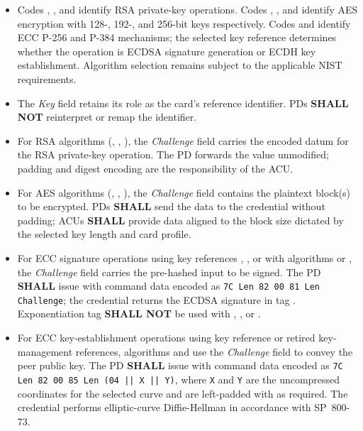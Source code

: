 \begin{itemize}
  \item Codes , , and  identify RSA private-key operations. Codes , , and  identify AES encryption with 128-, 192-, and 256-bit keys respectively. Codes  and  identify ECC P-256 and P-384 mechanisms; the selected key reference determines whether the operation is ECDSA signature generation or ECDH key establishment. Algorithm selection remains subject to the applicable NIST requirements.
  \item The \emph{Key} field retains its role as the card’s reference identifier. PDs \textbf{SHALL NOT} reinterpret or remap the identifier.
  \item For RSA algorithms (, , ), the \emph{Challenge} field carries the encoded datum for the RSA private-key operation. The PD forwards the value unmodified; padding and digest encoding are the responsibility of the ACU.
  \item For AES algorithms (, , ), the \emph{Challenge} field contains the plaintext block(s) to be encrypted. PDs \textbf{SHALL} send the data to the credential without padding; ACUs \textbf{SHALL} provide data aligned to the block size dictated by the selected key length and card profile.
  \item For ECC signature operations using key references , , or  with algorithms  or , the \emph{Challenge} field carries the pre-hashed input to be signed. The PD \textbf{SHALL} issue  with command data encoded as \texttt{7C Len 82 00 81 Len Challenge}; the credential returns the ECDSA signature in tag . Exponentiation tag  \textbf{SHALL NOT} be used with , , or .
  \item For ECC key-establishment operations using key reference  or retired key-management references, algorithms  and  use the \emph{Challenge} field to convey the peer public key. The PD \textbf{SHALL} issue  with command data encoded as \texttt{7C Len 82 00 85 Len (04 || X || Y)}, where \texttt{X} and \texttt{Y} are the uncompressed coordinates for the selected curve and are left-padded with  as required. The credential performs elliptic-curve Diffie-Hellman in accordance with SP~800-73.
\end{itemize}

